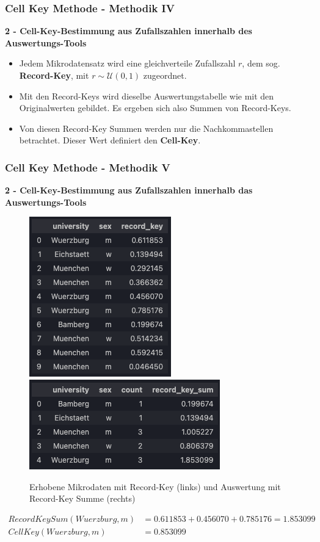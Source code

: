 \documentclass[aspectratio=169]{beamer}
\begin{document}
\begin{frame}{}
	\frametitle{Cell Key Methode - Methodik IV}
    \textbf{2 - Cell-Key-Bestimmung aus Zufallszahlen innerhalb des Auswertungs-Tools} 
    \begin{itemize}
        \item Jedem Mikrodatensatz wird eine gleichverteile Zufallszahl $r$, dem sog. \textbf{Record-Key}, mit $r \sim \mathcal{U}(0, 1)$ zugeordnet.
        \item Mit den Record-Keys wird dieselbe Auswertungstabelle wie mit den Originalwerten gebildet. Es ergeben sich also Summen von Record-Keys.
        \item Von diesen Record-Key Summen werden nur die Nachkommastellen betrachtet. Dieser Wert definiert den \textbf{Cell-Key}.
    \end{itemize}
\end{frame}


\begin{frame}{}
	\frametitle{Cell Key Methode - Methodik V}
    \textbf{2 - Cell-Key-Bestimmung aus Zufallszahlen innerhalb das Auswertungs-Tools} 
    \begin{figure}
		\centering
		\includegraphics[width=0.25\linewidth]{img/ckm_3.png}
        \includegraphics[width=0.3\linewidth]{img/ckm_4.png}
        \caption{Erhobene Mikrodaten mit Record-Key (links) und Auswertung mit Record-Key Summe (rechts)}
	\end{figure} 
    \begin{align*}
        RecordKeySum(Wuerzburg, m) & = 0.611853 + 0.456070 + 0.785176 = 1.853099 \\
        CellKey(Wuerzburg, m) & = 0.853099
    \end{align*}
\end{frame}
\end{document}
